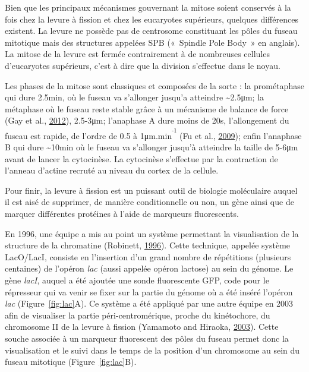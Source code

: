 \documentclass[12pt,a4paper,twoside,openright]{book}
\begin{document}
Bien que les principaux mécanismes gouvernant la mitose soient conservés
à la fois chez la levure à fission et chez les eucaryotes supérieurs,
quelques différences existent. La levure ne possède pas de centrosome
constituant les pôles du fuseau mitotique mais des structures appelées
SPB («~Spindle Pole Body~» en anglais). La mitose de la levure est
fermée contrairement à de nombreuses cellules d'eucaryotes supérieurs,
c'est à dire que la division s'effectue dans le noyau.

Les phases de la mitose sont classiques et composées de la sorte : la
prométaphase qui dure 2.5min, où le fuseau va s'allonger jusqu'a
atteindre \textasciitilde{}2.5μm; la métaphase où le fuseau reste stable
grâce à un mécanisme de balance de force (Gay et al.,
\protect\hyperlink{ref-Gay2012a}{2012}), 2.5-3μm; l'anaphase A dure
moins de 20s, l'allongement du fuseau est rapide, de l'ordre de 0.5 à
1μm.min\textsuperscript{\textsuperscript{-1}} (Fu et al.,
\protect\hyperlink{ref-Fu2009}{2009}); enfin l'anaphase B qui dure
\textasciitilde{}10min où le fuseau va s'allonger jusqu'à atteindre la
taille de 5-6μm avant de lancer la cytocinèse. La cytocinèse s'effectue
par la contraction de l'anneau d'actine recruté au niveau du cortex de
la cellule.

Pour finir, la levure à fission est un puissant outil de biologie
moléculaire auquel il est aisé de supprimer, de manière conditionnelle
ou non, un gène ainsi que de marquer différentes protéines à l'aide de
marqueurs fluorescents.

En 1996, une équipe a mis au point un système permettant la
visualisation de la structure de la chromatine (Robinett,
\protect\hyperlink{ref-Robinett1996}{1996}). Cette technique, appelée
système LacO/LacI, consiste en l'insertion d'un grand nombre de
répétitions (plusieurs centaines) de l'opéron \emph{lac} (aussi appelée
opéron lactose) au sein du génome. Le gène \emph{lacI}, auquel a été
ajoutée une sonde fluorescente GFP, code pour le répresseur qui va venir
se fixer sur la partie du génome où a été inséré l'opéron \emph{lac}
(Figure~\ref{fig:lac}A). Ce système a été appliqué par une autre équipe
en 2003 afin de visualiser la partie péri-centromérique, proche du
kinétochore, du chromosome II de la levure à fission (Yamamoto and
Hiraoka, \protect\hyperlink{ref-Yamamoto2003}{2003}). Cette souche
associée à un marqueur fluorescent des pôles du fuseau permet donc la
visualisation et le suivi dans le temps de la position d'un chromosome
au sein du fuseau mitotique (Figure~\ref{fig:lac}B).
\end{document}

